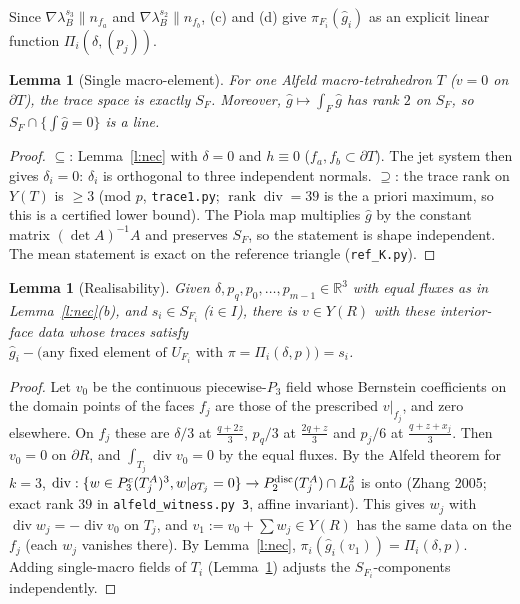\documentclass[11pt]{article}
\newtheorem{lemma}[theorem]{Lemma}
\theoremstyle{definition}
\newcommand{\R}{\mathbb R}
\newcommand{\gh}{\hat g}
\renewcommand{\div}{\operatorname{div}}
\begin{document}
Since $\nabla\lambda_B^{s_3}\parallel n_{f_a}$ and $\nabla\lambda_B^{s_2}\parallel n_{f_b}$, (c) and (d) give $\pi_{F_i}(\gh_i)$ as an explicit linear function $\Pi_i(\delta,(p_j))$.

\begin{lemma}[Single macro-element]\label{l:single}
For one Alfeld macro-tetrahedron $T$ ($v=0$ on $\partial T$), the trace space is exactly $S_F$. Moreover, $\gh\mapsto\int_F\gh$ has rank $2$ on $S_F$, so $S_F\cap\{\int\gh=0\}$ is a line.
\end{lemma}
\begin{proof}
$\subseteq$: Lemma~\ref{l:nec} with $\delta=0$ and $h\equiv0$ ($f_a,f_b\subset\partial T$). The jet system then gives $\delta_i=0$: $\delta_i$ is orthogonal to three independent normals. $\supseteq$: the trace rank on $Y(T)$ is $\ge3$ (mod $p$, \texttt{trace1.py}; $\operatorname{rank}\div=39$ is the a priori maximum, so this is a certified lower bound). The Piola map multiplies $\gh$ by the constant matrix $(\det A)^{-1}A$ and preserves $S_F$, so the statement is shape independent. The mean statement is exact on the reference triangle (\texttt{ref\_K.py}).
\end{proof}

\begin{lemma}[Realisability]\label{l:suff}
Given $\delta,p_q,p_0,\dots,p_{m-1}\in\R^3$ with equal fluxes as in Lemma~\ref{l:nec}(b), and $s_i\in S_{F_i}$ ($i\in I$), there is $v\in Y(R)$ with these interior-face data whose traces satisfy $\gh_i-\text{(any fixed element of $U_{F_i}$ with $\pi=\Pi_i(\delta,p)$)}=s_i$.
\end{lemma}
\begin{proof}
Let $v_0$ be the continuous piecewise-$P_3$ field whose Bernstein coefficients on the domain points of the faces $f_j$ are those of the prescribed $v|_{f_j}$, and zero elsewhere. On $f_j$ these are $\delta/3$ at $\frac{q+2z}3$, $p_q/3$ at $\frac{2q+z}3$ and $p_j/6$ at $\frac{q+z+x_j}3$. Then $v_0=0$ on $\partial R$, and $\int_{T_j}\div v_0=0$ by the equal fluxes. By the Alfeld theorem for $k=3$, $\div:\{w\in P_3^c(T_j^A)^3,w|_{\partial T_j}=0\}\to P_2^{\rm disc}(T_j^A)\cap L^2_0$ is onto (Zhang 2005; exact rank $39$ in \texttt{alfeld\_witness.py 3}, affine invariant). This gives $w_j$ with $\div w_j=-\div v_0$ on $T_j$, and $v_1:=v_0+\sum w_j\in Y(R)$ has the same data on the $f_j$ (each $w_j$ vanishes there). By Lemma~\ref{l:nec}, $\pi_i(\gh_i(v_1))=\Pi_i(\delta,p)$. Adding single-macro fields of $T_i$ (Lemma~\ref{l:single}) adjusts the $S_{F_i}$-components independently.
\end{proof}
\end{document}
